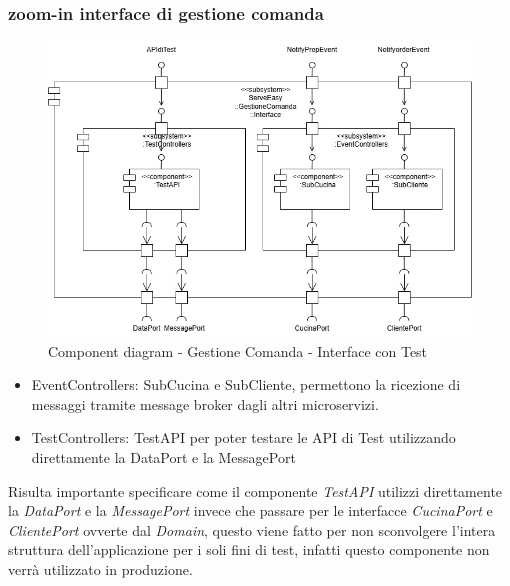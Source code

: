 \subsubsection*{zoom-in interface di gestione comanda}
\begin{figure}[H]
	\centering
	\includegraphics[scale=0.5]{iterazione1/images/component_comanda_w_test-GestioneComanda__Interface.jpg}
	\caption{Component diagram - Gestione Comanda - Interface con Test
    \label{fig:component_comanda_w_test-GestioneComanda__Interface}}
\end{figure}
\begin{itemize}
    \item EventControllers: SubCucina e SubCliente, permettono la ricezione di messaggi tramite message broker dagli altri microservizi.
    \item TestControllers: TestAPI per poter testare le API di Test utilizzando direttamente la DataPort e la MessagePort
\end{itemize}
Risulta importante specificare come il componente \textit{TestAPI} utilizzi direttamente la \textit{DataPort} e la \textit{MessagePort} invece che passare per le interfacce \textit{CucinaPort} e \textit{ClientePort} ovverte dal \textit{Domain}, questo viene fatto per non sconvolgere l'intera struttura dell'applicazione per i soli fini di test, infatti questo componente non verrà utilizzato in produzione.

